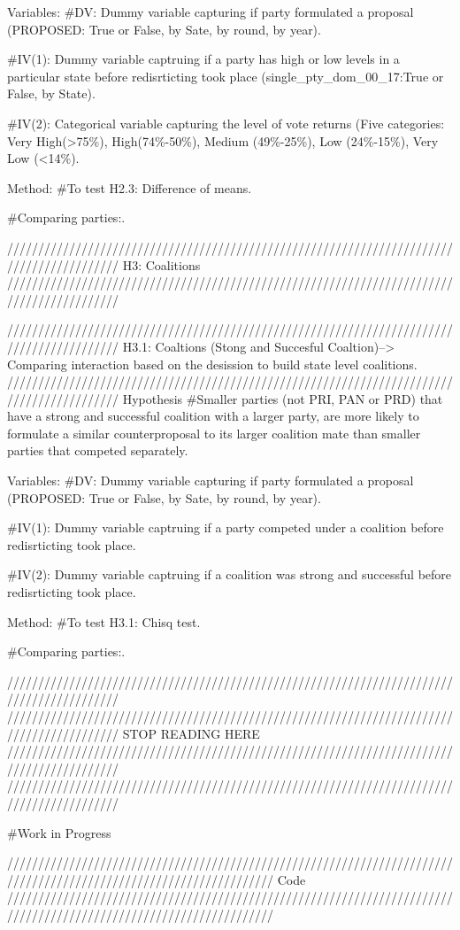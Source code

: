 \documentclass[
]{article}
\begin{document}
Variables: \#DV: Dummy variable capturing if party formulated a proposal
(PROPOSED: True or False, by Sate, by round, by year).

\#IV(1): Dummy variable captruing if a party has high or low levels in a
particular state before redisrticting took place
(single\_pty\_dom\_00\_17:True or False, by State).

\#IV(2): Categorical variable capturing the level of vote returns (Five
categories: Very High(\textgreater75\%), High(74\%-50\%), Medium
(49\%-25\%), Low (24\%-15\%), Very Low (\textless14\%).

Method: \#To test H2.3: Difference of means.

\#Comparing parties:.

//////////////////////////////////////////////////////////////////////////////////////////
H3: Coalitions
//////////////////////////////////////////////////////////////////////////////////////////

//////////////////////////////////////////////////////////////////////////////////////////
H3.1: Coaltions (Stong and Succesful Coaltion)--\textgreater{} Comparing
interaction based on the desission to build state level coalitions.\\
//////////////////////////////////////////////////////////////////////////////////////////
Hypothesis \#Smaller parties (not PRI, PAN or PRD) that have a strong
and successful coalition with a larger party, are more likely to
formulate a similar counterproposal to its larger coalition mate than
smaller parties that competed separately.

Variables: \#DV: Dummy variable capturing if party formulated a proposal
(PROPOSED: True or False, by Sate, by round, by year).

\#IV(1): Dummy variable captruing if a party competed under a coalition
before redisrticting took place.

\#IV(2): Dummy variable captruing if a coalition was strong and
successful before redisrticting took place.

Method: \#To test H3.1: Chisq test.

\#Comparing parties:.

//////////////////////////////////////////////////////////////////////////////////////////
//////////////////////////////////////////////////////////////////////////////////////////
STOP READING HERE
//////////////////////////////////////////////////////////////////////////////////////////
//////////////////////////////////////////////////////////////////////////////////////////

\#Work in Progress

///////////////////////////////////////////////////////////////////////////////////////////////////////////////////
Code
///////////////////////////////////////////////////////////////////////////////////////////////////////////////////
\end{document}
